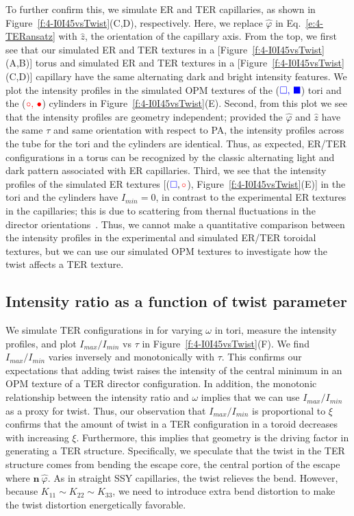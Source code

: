 To further confirm this, we simulate ER and TER capillaries, as shown in Figure~\ref{f:4-I0I45vsTwist}(C,D), respectively.
Here, we replace $\hat{\varphi}$ in Eq.~\ref{e:4-TERansatz} with $\hat{z}$, the orientation of the capillary axis.
From the top, we first see that our simulated ER and TER textures in a [Figure~\ref{f:4-I0I45vsTwist}(A,B)] torus and simulated ER and TER textures in a [Figure~\ref{f:4-I0I45vsTwist}(C,D)] capillary have the same alternating dark and bright intensity features.
We plot the intensity profiles in the simulated OPM textures of the (${\color{blue} \square,\,\blacksquare}$) tori and the (${\color{red} \circ,\,\bullet}$) cylinders in Figure~\ref{f:4-I0I45vsTwist}(E).
Second, from this plot we see that the intensity profiles are geometry independent; provided the $\hat{\varphi}$ and $\hat{z}$ have the same $\tau$ and same orientation with respect to PA, the intensity profiles across the tube for the tori and the cylinders are identical.
Thus, as expected, ER/TER configurations in a torus can be recognized by the classic alternating light and dark pattern associated with ER capillaries.
Third, we see that the intensity profiles of the simulated ER textures [(${\color{blue} \square},{\color{red} \circ}$), Figure~\ref{f:4-I0I45vsTwist}(E)] in the tori and the cylinders have $I_{min} = 0$, in contrast to the experimental ER textures in the capillaries; this is due to scattering from thernal fluctuations in the director orientations~\cite{RN33}.
Thus, we cannot make a quantitative comparison between the intensity profiles in the experimental and simulated ER/TER toroidal textures, but we can use our simulated OPM textures to investigate how the twist affects a TER texture.


\subsection{Intensity ratio as a function of twist parameter}
We simulate TER configurations in for varying $\omega$ in tori, measure the intensity profiles, and plot $I_{max}/I_{min}$ vs $\tau$ in Figure~\ref{f:4-I0I45vsTwist}(F).
We find $I_{max}/I_{min}$ varies inversely and monotonically with $\tau$.
This confirms our expectations that adding twist raises the intensity of the central minimum in an OPM texture of a TER director configuration.
In addition, the monotonic relationship between the intensity ratio and $\omega$ implies that we can use $I_{max}/I_{min}$ as a proxy for twist.
Thus, our observation that  $I_{max}/I_{min}$ is proportional to $\xi$ confirms that the amount of twist in a TER configuration in a toroid decreases with increasing $\xi$.
Furthermore, this implies that geometry is the driving factor in generating a TER structure.
Specifically, we speculate that the twist in the TER structure comes from bending the escape core, the central portion of the escape where $\mathbf{n}~\hat{\varphi}$.
As in straight SSY capillaries, the twist relieves the bend.
However, because $K_{11} \sim K_{22} \sim K_{33}$, we need to introduce extra bend distortion to make the twist distortion energetically favorable.


